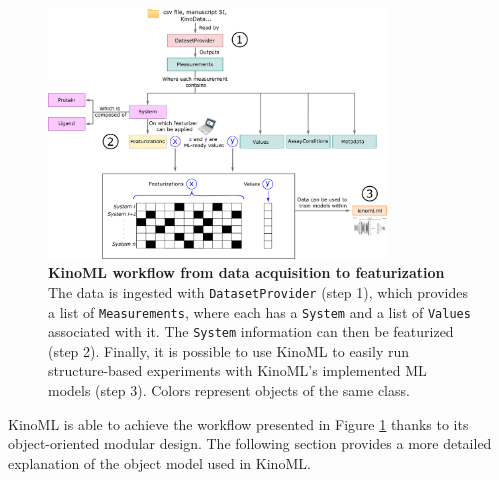 \documentclass[9pt,lessons]{livecoms}
\begin{document}
\begin{figure}[ht]
    \centering
	
    

	\includegraphics[width=0.8\textwidth]{figures/fig_1_kinomltechpaper_v5.pdf}

	

	\caption{\textbf{KinoML workflow from data acquisition to featurization}
    The data is ingested with \texttt{DatasetProvider} (step 1), which provides a list of \texttt{Measurements}, where each has a \texttt{System} and a list of \texttt{Values} associated with it. The \texttt{System} information can then be featurized (step 2). Finally, it is possible to use KinoML to easily run structure-based experiments with KinoML's implemented  ML models (step 3). Colors represent objects of the same class. }
	\label{figure:kinoml-worflow}    
\end{figure}

KinoML is able to achieve the workflow presented in Figure \ref{figure:kinoml-worflow} thanks to its object-oriented modular design. The following section provides a more detailed explanation of the object model used in KinoML.
\end{document}
